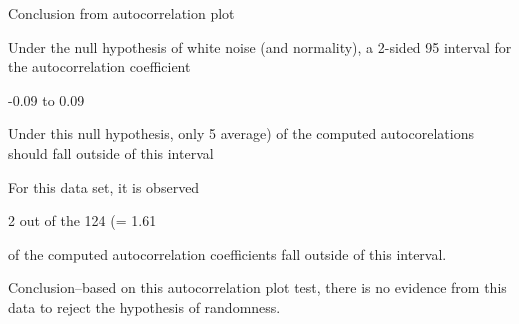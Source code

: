 
Conclusion from autocorrelation plot

      Under the null hypothesis of white noise
      (and normality), a 2-sided 95%
      interval for the autocorrelation coefficient

           -0.09      to       0.09

      Under this null hypothesis, only 5
      average) of the computed autocorelations
      should fall outside of this interval

      For this data set, it is observed

             2     out of the      124 (=    1.61%

      of the computed autocorrelation coefficients fall
      outside of this interval.

Conclusion--based on this autocorrelation
            plot test, there is no evidence from
            this data to reject the hypothesis
            of randomness.

